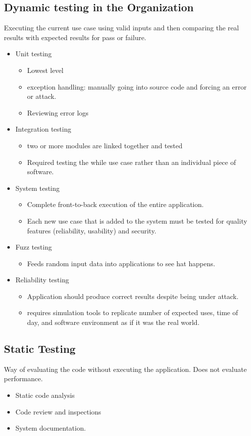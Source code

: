 \documentclass[12pt]{article}
\begin{document}
\subsection{Dynamic testing in the Organization}
Executing the current use case using valid inputs and then comparing the real results with expected
results for pass or failure.
\begin{itemize}
	\item Unit testing
		\begin{itemize}
			\item Lowest level
			\item exception handling: manually going into source code and forcing an 
				error or attack.
			\item Reviewing error logs
		\end{itemize}
	\item Integration testing
		\begin{itemize}
			\item two or more modules are linked together and tested
			\item Required testing the while use case rather than an individual piece of
				software.
		\end{itemize}
	\item System testing
		\begin{itemize}
			\item Complete front-to-back execution of the entire application.
			\item Each new use case that is added to the system must be tested for quality
				features (reliability, usability) and security.
		\end{itemize}
	\item Fuzz testing 
		\begin{itemize}
			\item Feeds random input data into applications to see hat happens.
		\end{itemize}
	\item Reliability testing
		\begin{itemize}
			\item Application should produce correct results despite being under attack.
			\item requires simulation tools to replicate number of expected uses, time of day,
				and software environment as if it  was the real world.
		\end{itemize}
\end{itemize}
\subsection{Static Testing}
Way of evaluating the code without executing the application. Does not evaluate performance.
\begin{itemize}
	\item Static code analysis
	\item Code review and inspections
	\item System documentation.
\end{itemize}
\end{document}
